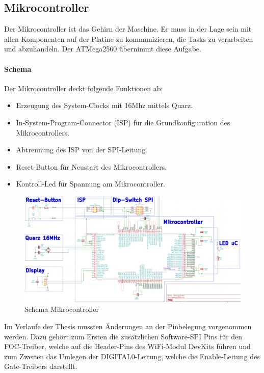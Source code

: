 \subsection{Mikrocontroller}
\label{subsec:Mikrocontroller}

Der Mikrocontroller ist das Gehirn der Maschine. Er muss in der Lage sein mit allen Komponenten auf der Platine zu kommunizieren, die Tasks zu verarbeiten und abzuhandeln. Der ATMega2560 übernimmt diese Aufgabe.


\paragraph{Schema}\mbox{}

Der Mikrocontroller deckt folgende Funktionen ab:
\begin{itemize}
\item Erzeugung des System-Clocks mit 16Mhz mittels Quarz.
\item In-System-Program-Connector (ISP) für die Grundkonfiguration des Mikrocontrollers.
\item Abtrennung des ISP von der SPI-Leitung.
\item Reset-Button für Neustart des Mikrocontrollers.
\item Kontroll-Led für Spannung am Mikrocontroller.
\end{itemize}

\begin{figure}[H]
\center
\includegraphics[width = \textwidth]{graphics/Schema_uC}
\caption{Schema Mikrocontroller}
\label{fig:Schema_uC}
\end{figure}

Im Verlaufe der Thesis mussten Änderungen an der Pinbelegung vorgenommen werden. Dazu gehört zum Ersten die zusätzlichen Software-SPI Pins für den FOC-Treiber, welche auf die Header-Pins des WiFi-Modul DevKits führen und zum Zweiten das Umlegen der DIGITAL0-Leitung, welche die Enable-Leitung des Gate-Treibers darstellt.

